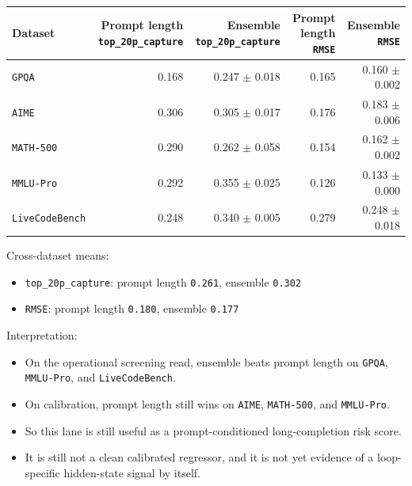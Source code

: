 \documentclass[11pt]{article}
\begin{document}
\begin{center}
\small
\begin{tabular}{@{}lrrrr@{}}
\toprule
Dataset & Prompt length \texttt{top\_20p\_capture} & Ensemble \texttt{top\_20p\_capture} & Prompt length \texttt{RMSE} & Ensemble \texttt{RMSE} \\
\midrule
\texttt{GPQA} & 0.168 & 0.247 $\pm$ 0.018 & 0.165 & 0.160 $\pm$ 0.002 \\
\texttt{AIME} & 0.306 & 0.305 $\pm$ 0.017 & 0.176 & 0.183 $\pm$ 0.006 \\
\texttt{MATH-500} & 0.290 & 0.262 $\pm$ 0.058 & 0.154 & 0.162 $\pm$ 0.002 \\
\texttt{MMLU-Pro} & 0.292 & 0.355 $\pm$ 0.025 & 0.126 & 0.133 $\pm$ 0.000 \\
\texttt{LiveCodeBench} & 0.248 & 0.340 $\pm$ 0.005 & 0.279 & 0.248 $\pm$ 0.018 \\
\bottomrule
\end{tabular}
\end{center}

Cross-dataset means:
\begin{itemize}[leftmargin=1.5em]
\item \texttt{top\_20p\_capture}: prompt length \texttt{0.261}, ensemble \texttt{0.302}
\item \texttt{RMSE}: prompt length \texttt{0.180}, ensemble \texttt{0.177}
\end{itemize}

Interpretation:
\begin{itemize}[leftmargin=1.5em]
\item On the operational screening read, ensemble beats prompt length on \texttt{GPQA}, \texttt{MMLU-Pro}, and \texttt{LiveCodeBench}.
\item On calibration, prompt length still wins on \texttt{AIME}, \texttt{MATH-500}, and \texttt{MMLU-Pro}.
\item So this lane is still useful as a prompt-conditioned long-completion risk score.
\item It is still not a clean calibrated regressor, and it is not yet evidence of a loop-specific hidden-state signal by itself.
\end{itemize}
\end{document}
